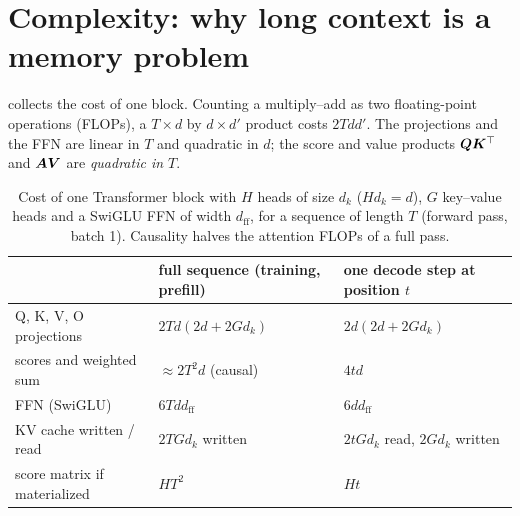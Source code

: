\section{Complexity: why long context is a memory problem}\label{sec:c01-complexity}

 collects the cost of one block. Counting a multiply--add as two
floating-point operations (FLOPs), a $T\times d$ by $d\times d'$ product costs $2Tdd'$.
The projections and the FFN are linear in $T$ and quadratic in $d$; the score and value
products $\bm{Q}\bm{K}^{\top}$ and $\bm{A}\bm{V}$ are \emph{quadratic in $T$}.

\begin{table}[t]
\centering
\caption{Cost of one Transformer block with $H$ heads of size $d_k$ ($Hd_k = d$), $G$
key--value heads and a SwiGLU FFN of width $d_{\mathrm{ff}}$, for a sequence of length $T$
(forward pass, batch 1). Causality halves the attention FLOPs of a full pass.}
\label{tab:c01-costs}
\begin{tabular}{@{}lll@{}}
\toprule
 & full sequence (training, prefill) & one decode step at position $t$\\
\midrule
Q, K, V, O projections & $2Td(2d + 2Gd_k)$ & $2d(2d + 2Gd_k)$\\
scores and weighted sum & $\approx 2T^2 d$ (causal) & $4td$\\
FFN (SwiGLU) & $6Tdd_{\mathrm{ff}}$ & $6dd_{\mathrm{ff}}$\\
KV cache written / read & $2TGd_k$ written & $2tGd_k$ read, $2Gd_k$ written\\
score matrix if materialized & $HT^2$ & $Ht$\\
\bottomrule
\end{tabular}
\end{table}

